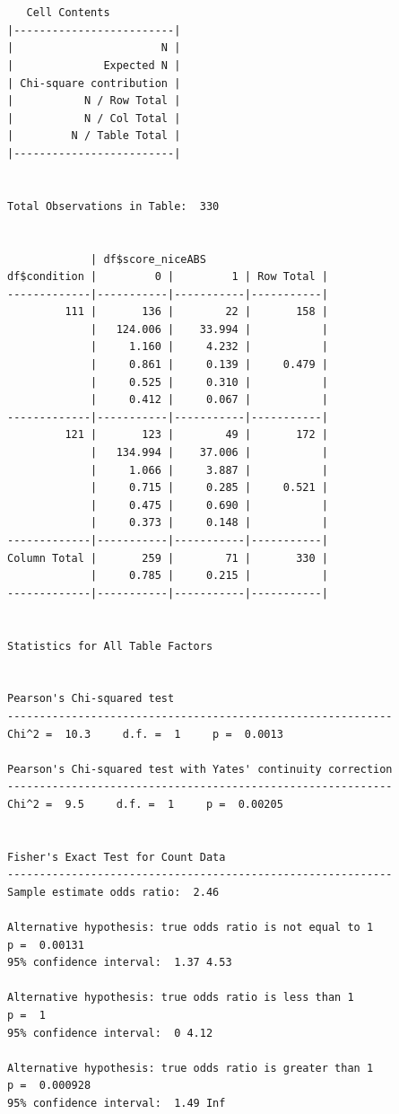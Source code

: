 \documentclass[
  letterpaper,
  DIV=11,
  numbers=noendperiod]{scrreprt}
\begin{document}
\begin{verbatim}

 
   Cell Contents
|-------------------------|
|                       N |
|              Expected N |
| Chi-square contribution |
|           N / Row Total |
|           N / Col Total |
|         N / Table Total |
|-------------------------|

 
Total Observations in Table:  330 

 
             | df$score_niceABS 
df$condition |         0 |         1 | Row Total | 
-------------|-----------|-----------|-----------|
         111 |       136 |        22 |       158 | 
             |   124.006 |    33.994 |           | 
             |     1.160 |     4.232 |           | 
             |     0.861 |     0.139 |     0.479 | 
             |     0.525 |     0.310 |           | 
             |     0.412 |     0.067 |           | 
-------------|-----------|-----------|-----------|
         121 |       123 |        49 |       172 | 
             |   134.994 |    37.006 |           | 
             |     1.066 |     3.887 |           | 
             |     0.715 |     0.285 |     0.521 | 
             |     0.475 |     0.690 |           | 
             |     0.373 |     0.148 |           | 
-------------|-----------|-----------|-----------|
Column Total |       259 |        71 |       330 | 
             |     0.785 |     0.215 |           | 
-------------|-----------|-----------|-----------|

 
Statistics for All Table Factors


Pearson's Chi-squared test 
------------------------------------------------------------
Chi^2 =  10.3     d.f. =  1     p =  0.0013 

Pearson's Chi-squared test with Yates' continuity correction 
------------------------------------------------------------
Chi^2 =  9.5     d.f. =  1     p =  0.00205 

 
Fisher's Exact Test for Count Data
------------------------------------------------------------
Sample estimate odds ratio:  2.46 

Alternative hypothesis: true odds ratio is not equal to 1
p =  0.00131 
95% confidence interval:  1.37 4.53 

Alternative hypothesis: true odds ratio is less than 1
p =  1 
95% confidence interval:  0 4.12 

Alternative hypothesis: true odds ratio is greater than 1
p =  0.000928 
95% confidence interval:  1.49 Inf 


 
\end{verbatim}
\end{document}

